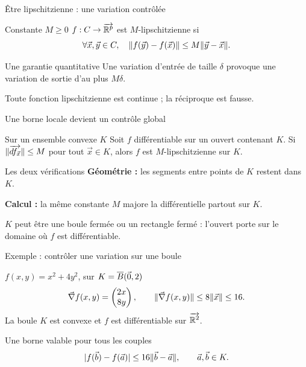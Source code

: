 \begin{frame}[t]{Être lipschitzienne : une variation contrôlée}
\coursanalyse
\begin{notion}{Constante $M\ge0$}
$f:C\to\overrightarrow{\mathbb R^{p}}$ est $M$-lipschitzienne si
\[\forall\vec x,\vec y\in C,\quad\lVert f(\vec y)-f(\vec x)\rVert\le M\lVert \vec y-\vec x\rVert.\]
\end{notion}
\begin{resultat}{Une garantie quantitative}
Une variation d'entrée de taille $\delta$ provoque une variation de sortie d'au plus $M\delta$.
\end{resultat}
\vfill Toute fonction lipschitzienne est continue ; la réciproque est fausse.
\end{frame}

\begin{frame}[t]{Une borne locale devient un contrôle global}
\coursanalyse
\begin{theoreme}{Sur un ensemble convexe $K$}
Soit $f$ différentiable sur un ouvert contenant $K$.
Si $\lVert \overrightarrow{df_{\vec x}}\rVert\le M$ pour tout $\vec x\in K$, alors $f$ est $M$-lipschitzienne sur $K$.
\end{theoreme}
\begin{cours}{Les deux vérifications}
\textbf{Géométrie :} les segments entre points de $K$ restent dans $K$.

\medskip
\textbf{Calcul :} la même constante $M$ majore la différentielle partout sur $K$.
\end{cours}
\vfill $K$ peut être une boule fermée ou un rectangle fermé : l'ouvert porte sur le domaine où $f$ est différentiable.
\end{frame}

\begin{frame}[t]{Exemple : contrôler une variation sur une boule}
\coursanalyse
\begin{exemple}{$f(x,y)=x^2+4y^2$, sur $K=\overline B(\vec 0,2)$}
\[\vec\nabla f(x,y)=\begin{pmatrix}2x\\8y\end{pmatrix},\qquad\lVert \vec\nabla f(x,y)\rVert\le8\lVert \vec x\rVert\le16.\]
La boule $K$ est convexe et $f$ est différentiable sur $\overrightarrow{\mathbb R^{2}}$.
\end{exemple}
\begin{resultat}{Une borne valable pour tous les couples}
\[|f(\vec b)-f(\vec a)|\le16\lVert \vec b-\vec a\rVert,\qquad\vec a,\vec b\in K.\]
\end{resultat}
\end{frame}

